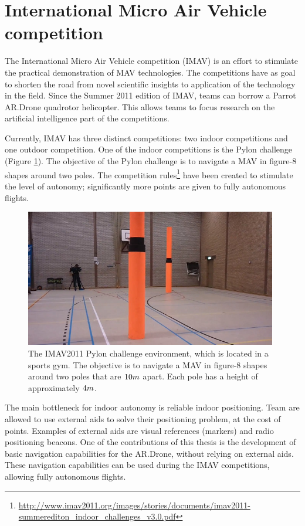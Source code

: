 	\section{International Micro Air Vehicle competition}
\label{sec:introduction-imav}
The International Micro Air Vehicle competition (IMAV) is an effort to stimulate the practical demonstration of MAV technologies.
The competitions have as goal to shorten the road from novel scientific insights to application of the technology in the field.
Since the Summer 2011 edition of IMAV, teams can borrow a Parrot AR.Drone quadrotor helicopter.
This allows teams to focus research on the artificial intelligence part of the competitions.

Currently, IMAV has three distinct competitions: two indoor competitions and one outdoor competition.
One of the indoor competitions is the Pylon challenge (Figure \ref{fig:imav2011_pylon}).
The objective of the Pylon challenge is to navigate a MAV in figure-8 shapes around two poles.
The competition rules\footnote{\url{http://www.imav2011.org/images/stories/documents/imav2011-summerediton_indoor_challenges_v3.0.pdf}} have been created to stimulate the level of autonomy; significantly more points are given to fully autonomous flights.

\begin{figure}[htb]
\centering
\includegraphics[width=11cm]{images/imav2011_pylon.jpg}
\caption{The IMAV2011 Pylon challenge environment, which is located in a sports gym.
The objective is to navigate a MAV in figure-8 shapes around two poles that are $10\small{m}$ apart. Each pole has a height of approximately $4\small{m}$.}
\label{fig:imav2011_pylon}
\end{figure}

The main bottleneck for indoor autonomy is reliable indoor positioning.
Team are allowed to use external aids to solve their positioning problem, at the cost of points.
Examples of external aids are visual references (markers) and radio positioning beacons.
One of the contributions of this thesis is the development of basic navigation capabilities for the AR.Drone, without relying on external aids.
These navigation capabilities can be used during the IMAV competitions, allowing fully autonomous flights.

